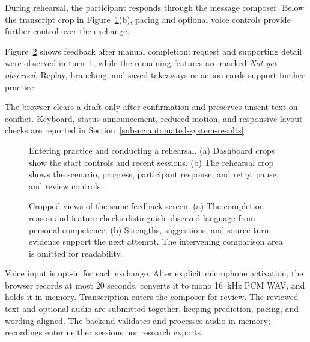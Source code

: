 During rehearsal, the participant responds through the message composer. Below the transcript crop in Figure~\ref{fig:app-roleplay}(b), pacing and optional voice controls provide further control over the exchange.
\label{subsec:frontend-roleplay-workspace}

Figure~\ref{fig:app-feedback} shows feedback after manual completion: request and supporting detail were observed in turn~1, while the remaining features are marked \emph{Not yet observed}. Replay, branching, and saved takeaways or action cards support further practice.
\label{subsec:frontend-feedback-interfaces}

The browser clears a draft only after confirmation and preserves unsent text on conflict. Keyboard, status-announcement, reduced-motion, and responsive-layout checks are reported in Section~\ref{subsec:automated-system-results}.
\label{subsec:frontend-testing}

\begin{figure}[htbp]
\centering

\caption[Entering practice and conducting a rehearsal.]{Entering practice and conducting a rehearsal. (a) Dashboard crops show the start controls and recent sessions. (b) The rehearsal crop shows the scenario, progress, participant response, and retry, pause, and review controls.}
\label{fig:app-roleplay}
\end{figure}

\begin{figure}[htbp]
\centering

\caption[Reviewing feedback after a rehearsal.]{Cropped views of the same feedback screen. (a) The completion reason and feature checks distinguish observed language from personal competence. (b) Strengths, suggestions, and source-turn evidence support the next attempt. The intervening comparison area is omitted for readability.}
\label{fig:app-feedback}
\end{figure}

\clearpage
Voice input is opt-in for each exchange. After explicit microphone activation, the browser records at most 20 seconds, converts it to mono 16~kHz PCM WAV, and holds it in memory. Transcription enters the composer for review. The reviewed text and optional audio are submitted together, keeping prediction, pacing, and wording aligned. The backend validates and processes audio in memory; recordings enter neither sessions nor research exports.
\label{subsec:frontend-voice}
\label{subsec:audio-conversation-data}

